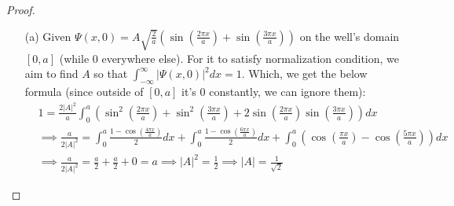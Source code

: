 \documentclass{article}
\begin{document}
\begin{proof}

    \hfil

    \begin{itemize}
        \item[(a)]Given $\Psi(x,0)=A\sqrt{\frac{2}{a}}\left(\sin(\frac{2\pi x}{a})+\sin(\frac{3\pi x}{a})\right)$ on the well's domain $[0,a]$ (while $0$ everywhere else). For it to satisfy normalization condition, we aim to find $A$ so that $\int_{-\infty}^{\infty}|\Psi(x,0)|^2 dx=1$. Which, we get the below formula (since outside of $[0,a]$ it's $0$ constantly, we can ignore them):
        \begin{align}
            &1=\frac{2|A|^2}{a}\int_{0}^{a}\left(\sin^2\left(\frac{2\pi x}{a}\right)+\sin^2\left(\frac{3\pi x}{a}\right)+2\sin\left(\frac{2\pi x}{a}\right)\sin\left(\frac{3\pi x}{a}\right)\right)dx\\
            &\implies \frac{a}{2|A|^2}= \int_{0}^{a}\frac{1-\cos(\frac{4\pi x}{a})}{2}dx + \int_{0}^{a}\frac{1-\cos(\frac{6\pi x}{a})}{2}dx + \int_{0}^{a}\left(\cos\left(\frac{\pi x}{a}\right)-\cos\left(\frac{5\pi x}{a}\right)\right)dx\\
            &\implies \frac{a}{2|A|^2} = \frac{a}{2}+\frac{a}{2}+0 = a \implies |A|^2=\frac{1}{2}\implies |A|=\frac{1}{\sqrt{2}}
        \end{align}

        \hfil


\end{itemize}
\end{proof}
\end{document}
